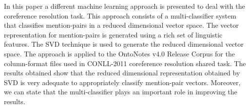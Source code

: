 In this paper a different machine learning approach is presented to deal with the coreference resolution task. This approach consists of a multi-classifier system that classifies mention-pairs in a reduced dimensional vector space. The vector representation for mention-pairs is generated using a rich set of linguistic features. The SVD technique is used to generate the reduced dimensional vector space. The approach is applied to the OntoNotes v4.0 Release Corpus for the column-format files used in CONLL-2011 coreference resolution shared task. The results obtained show that the reduced dimensional representation obtained by SVD is very adequate to appropriately classify mention-pair vectors. Moreover, we can state that the multi-classifier plays an important role in improving the results.
